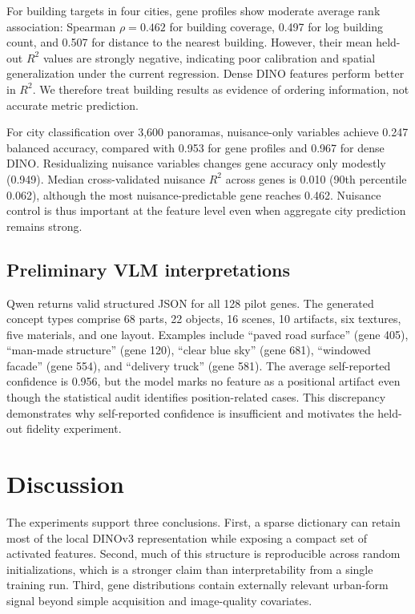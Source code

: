 \documentclass[10pt]{article}
\begin{document}
For building targets in four cities, gene profiles show moderate average rank
association: Spearman $\rho=0.462$ for building coverage, 0.497 for log building
count, and 0.507 for distance to the nearest building. However, their mean held-out
$R^2$ values are strongly negative, indicating poor calibration and spatial
generalization under the current regression. Dense DINO features perform better in
$R^2$. We therefore treat building results as evidence of ordering information, not
accurate metric prediction.

For city classification over 3,600 panoramas, nuisance-only variables achieve 0.247
balanced accuracy, compared with 0.953 for gene profiles and 0.967 for dense DINO.
Residualizing nuisance variables changes gene accuracy only modestly (0.949).
Median cross-validated nuisance $R^2$ across genes is 0.010 (90th percentile 0.062),
although the most nuisance-predictable gene reaches 0.462. Nuisance control is thus
important at the feature level even when aggregate city prediction remains strong.

\subsection{Preliminary VLM interpretations}
Qwen returns valid structured JSON for all 128 pilot genes. The generated concept
types comprise 68 parts, 22 objects, 16 scenes, 10 artifacts, six textures, five
materials, and one layout. Examples include ``paved road surface'' (gene 405),
``man-made structure'' (gene 120), ``clear blue sky'' (gene 681), ``windowed
facade'' (gene 554), and ``delivery truck'' (gene 581). The average self-reported
confidence is 0.956, but the model marks no feature as a positional artifact even
though the statistical audit identifies position-related cases. This discrepancy
demonstrates why self-reported confidence is insufficient and motivates the held-out
fidelity experiment.

\section{Discussion}
The experiments support three conclusions. First, a sparse dictionary can retain
most of the local DINOv3 representation while exposing a compact set of activated
features. Second, much of this structure is reproducible across random
initializations, which is a stronger claim than interpretability from a single
training run. Third, gene distributions contain externally relevant urban-form
signal beyond simple acquisition and image-quality covariates.
\end{document}
